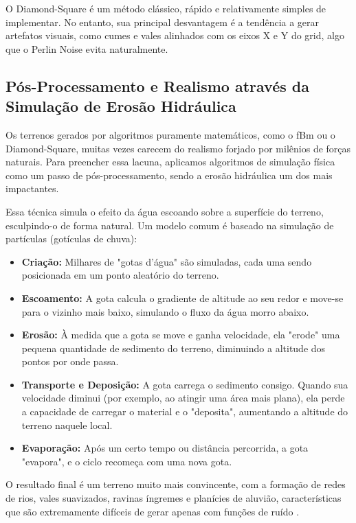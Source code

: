 O Diamond-Square é um método clássico, rápido e relativamente simples de implementar. No entanto, sua principal desvantagem é a tendência a gerar artefatos visuais, como cumes e vales alinhados com os eixos X e Y do grid, algo que o Perlin Noise evita naturalmente.

\subsection{Pós-Processamento e Realismo através da Simulação de Erosão Hidráulica}

Os terrenos gerados por algoritmos puramente matemáticos, como o fBm ou o Diamond-Square, muitas vezes carecem do realismo forjado por milênios de forças naturais. Para preencher essa lacuna, aplicamos algoritmos de simulação física como um passo de pós-processamento, sendo a erosão hidráulica um dos mais impactantes.

Essa técnica simula o efeito da água escoando sobre a superfície do terreno, esculpindo-o de forma natural. Um modelo comum é baseado na simulação de partículas (gotículas de chuva):

\begin{itemize}
    \item \textbf{Criação:} Milhares de "gotas d'água" são simuladas, cada uma sendo posicionada em um ponto aleatório do terreno.

    \item \textbf{Escoamento:} A gota calcula o gradiente de altitude ao seu redor e move-se para o vizinho mais baixo, simulando o fluxo da água morro abaixo.

    \item \textbf{Erosão:} À medida que a gota se move e ganha velocidade, ela "erode" uma pequena quantidade de sedimento do terreno, diminuindo a altitude dos pontos por onde passa.

    \item \textbf{Transporte e Deposição:} A gota carrega o sedimento consigo. Quando sua velocidade diminui (por exemplo, ao atingir uma área mais plana), ela perde a capacidade de carregar o material e o "deposita", aumentando a altitude do terreno naquele local.

    \item \textbf{Evaporação:} Após um certo tempo ou distância percorrida, a gota "evapora", e o ciclo recomeça com uma nova gota.
\end{itemize}

O resultado final é um terreno muito mais convincente, com a formação de redes de rios, vales suavizados, ravinas íngremes e planícies de aluvião, características que são extremamente difíceis de gerar apenas com funções de ruído \cite{erosion}.

